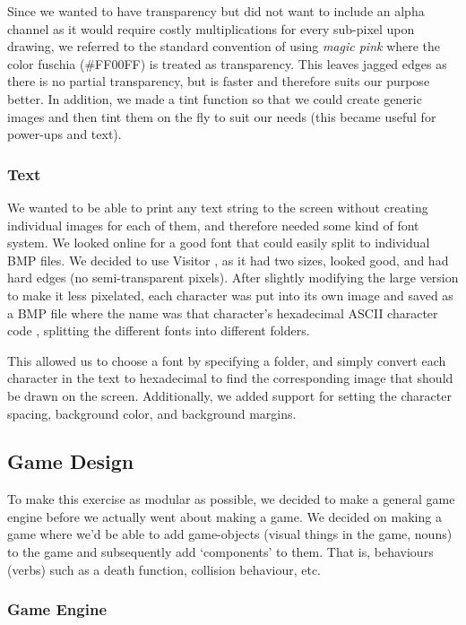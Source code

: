 \documentclass[a4paper,12pt]{article}
\begin{document}
Since we wanted to have transparency but did not want to include an alpha channel as it would require costly multiplications for every sub-pixel upon drawing, we referred to the standard convention of using \emph{magic pink} where the color fuschia (\#FF00FF) is treated as transparency. This leaves jagged edges as there is no partial transparency, but is faster and therefore suits our purpose better. In addition, we made a tint function so that we could create generic images and then tint them on the fly to suit our needs (this became useful for power-ups and text).

\subsubsection{Text} %

We wanted to be able to print any text string to the screen without creating individual images for each of them, and therefore needed some kind of font system. We looked online for a good font that could easily split to individual BMP files. We decided to use Visitor \cite{font}, as it had two sizes, looked good, and had hard edges (no semi-transparent pixels). After slightly modifying the large version to make it less pixelated, each character was put into its own image and saved as a BMP file where the name was that character’s hexadecimal ASCII character code \cite{ascii}, splitting the different fonts into different folders.

This allowed us to choose a font by specifying a folder, and simply convert each character in the text to hexadecimal to find the corresponding image that should be drawn on the screen. Additionally, we added support for setting the character spacing, background color, and background margins.

\subsection{Game Design} %

To make this exercise as modular as possible, we decided to make a general game engine before we actually went about making a game. We decided on making a game where we'd be able to add game-objects (visual things in the game, nouns) to the game and subsequently add ‘components’ to them. That is, behaviours (verbs) such as a death function, collision behaviour, etc.

\subsubsection{Game Engine} %
\end{document}
